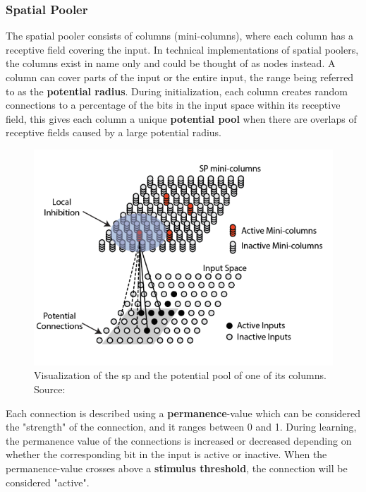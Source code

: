 \subsubsection{Spatial Pooler}
\label{sec:spatial_pooler}
The spatial pooler consists of columns (mini-columns), where each column has a receptive field covering the input. In technical implementations of spatial poolers, the columns exist in name only and could be thought of as nodes instead. A column can cover parts of the input or the entire input, the range being referred to as the \textbf{potential radius}. During initialization, each column creates random connections to a percentage of the bits in the input space within its receptive field, this gives each column a unique \textbf{potential pool} when there are overlaps of receptive fields caused by a large potential radius.\par
\begin{figure}[H]
    \centering
    \includegraphics[width=\linewidth]{resources/related_works/sp_vis_alt.png}
    \caption{Visualization of the \gls*{sp} and the potential pool of one of its columns. Source: \cite{htm_sp_presentation}}
\end{figure}
Each connection is described using a \textbf{permanence}-value which can be considered the "strength" of the connection, and it ranges between 0 and 1. During learning, the permanence value of the connections is increased or decreased depending on whether the corresponding bit in the input is active or inactive. When the permanence-value crosses above a \textbf{stimulus threshold}, the connection will be considered "active".

